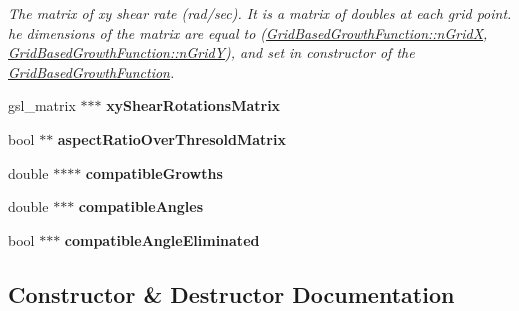 \begin{DoxyCompactItemize}
\begin{DoxyCompactList}\small\item\em The matrix of xy shear rate (rad/sec). It is a matrix of doubles at each grid point. he dimensions of the matrix are equal to (\hyperlink{classGridBasedGrowthFunction_af872b9963f3a579dcd615c23bcb58a86}{Grid\+Based\+Growth\+Function\+::n\+Grid\+X}, \hyperlink{classGridBasedGrowthFunction_a625bc963a1f1e7d1f1a35dbd0ef51728}{Grid\+Based\+Growth\+Function\+::n\+Grid\+Y}), and set in constructor of the \hyperlink{classGridBasedGrowthFunction}{Grid\+Based\+Growth\+Function}. \end{DoxyCompactList}\item 
\hypertarget{classGridBasedGrowthFunction_a62e3267b367261ff2f37cee9a7c2b02b}{}gsl\+\_\+matrix $\ast$$\ast$$\ast$ {\bfseries xy\+Shear\+Rotations\+Matrix}\label{classGridBasedGrowthFunction_a62e3267b367261ff2f37cee9a7c2b02b}

\item 
\hypertarget{classGridBasedGrowthFunction_a56ff4380487e4d24881431f0e6ea6f2e}{}bool $\ast$$\ast$ {\bfseries aspect\+Ratio\+Over\+Thresold\+Matrix}\label{classGridBasedGrowthFunction_a56ff4380487e4d24881431f0e6ea6f2e}

\item 
\hypertarget{classGridBasedGrowthFunction_a59b0e127387157f89f099ae3beeaa671}{}double $\ast$$\ast$$\ast$$\ast$ {\bfseries compatible\+Growths}\label{classGridBasedGrowthFunction_a59b0e127387157f89f099ae3beeaa671}

\item 
\hypertarget{classGridBasedGrowthFunction_aac8a163bbd008d327859b488cf023c10}{}double $\ast$$\ast$$\ast$ {\bfseries compatible\+Angles}\label{classGridBasedGrowthFunction_aac8a163bbd008d327859b488cf023c10}

\item 
\hypertarget{classGridBasedGrowthFunction_addfc2d280d1fc0b0b17d7f1dfe54f873}{}bool $\ast$$\ast$$\ast$ {\bfseries compatible\+Angle\+Eliminated}\label{classGridBasedGrowthFunction_addfc2d280d1fc0b0b17d7f1dfe54f873}

\end{DoxyCompactItemize}


\subsection{Constructor \& Destructor Documentation}
\hypertarget{classGridBasedGrowthFunction_aed515e78b2dbcf81751b44cb0c2bef58}{}
